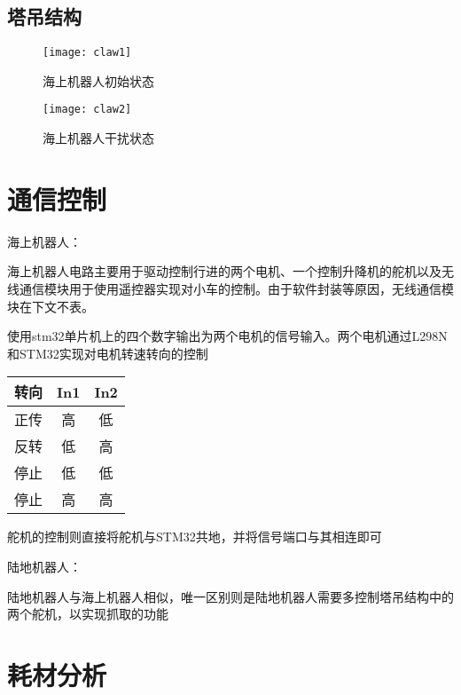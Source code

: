 \documentclass{Robot}
\begin{document}
        \subsection{塔吊结构}
        \begin{figure}[H]
            \centering
                \begin{minipage}[t]{0.48\textwidth}
                    \centering
                    \texttt{[image: claw1]}
                    \caption{海上机器人初始状态}
                \end{minipage}
                \begin{minipage}[t]{0.48\textwidth}
                    \centering
                    \texttt{[image: claw2]}
                    \caption{海上机器人干扰状态}
                \end{minipage}
            \end{figure}
    \section{通信控制}

    海上机器人：
    \par
    海上机器人电路主要用于驱动控制行进的两个电机、一个控制升降机的舵机以及无线通信模块用于使用遥控器实现对小车的控制。由于软件封装等原因，无线通信模块在下文不表。
    \par
    使用stm32单片机上的四个数字输出为两个电机的信号输入。两个电机通过L298N和STM32实现对电机转速转向的控制
    \begin{table}[H]
        \centering
        \begin{tabular}{|c|c|c|}
        \hline
        转向 & In1 & In2 \\ \hline
        正传 & 高   & 低   \\ \hline
        反转 & 低   & 高   \\ \hline
        停止 & 低   & 低   \\ \hline
        停止 & 高   & 高   \\ \hline
        \end{tabular}
    \end{table}
    舵机的控制则直接将舵机与STM32共地，并将信号端口与其相连即可
    \par
    陆地机器人：
    \par
    陆地机器人与海上机器人相似，唯一区别则是陆地机器人需要多控制塔吊结构中的两个舵机，以实现抓取的功能

    \section{耗材分析}
\end{document}

